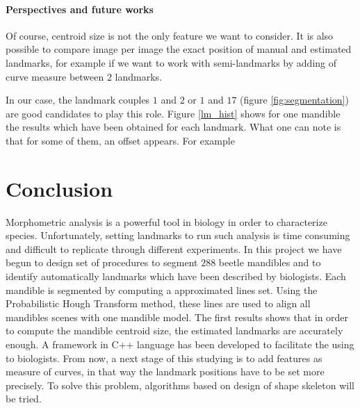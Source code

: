 \documentclass[twoside,twocolumn,10pt]{article}
\begin{document}
\paragraph{Perspectives and future works}
Of course, centroid size is not the only feature we want to
consider. It is also possible to compare image per image the exact
position of manual and estimated landmarks, for example if we want to
work with semi-landmarks by adding of curve measure between $2$
landmarks.

In our case, the landmark couples $1$ and $2$ or $1$ and $17$ (figure
\ref{fig:segmentation}) are good candidates to play this role. Figure
\ref{lm_hist} shows for one mandible the results which have been obtained
for each landmark. What one can note is that for some of them, an
offset appears. For example 
\section{Conclusion}
Morphometric analysis is a powerful tool in biology in order to
characterize species. Unfortunately, setting landmarks to run such
analysis is time consuming and difficult to replicate through
different experiments. In this project we have begun to design set of
procedures to segment $288$ beetle mandibles and to identify automatically
landmarks which have been described by biologists. Each mandible is
segmented by computing a approximated lines set. Using the
Probabilistic Hough Transform method, these lines are
used to align all mandibles scenes with one mandible model. The
first results shows that in order to compute the mandible centroid
size, the estimated landmarks are accurately enough. A framework in
C++ language has been developed to facilitate the using
to biologists. From now, a next stage of this studying is to add features as measure of curves,
in that way the landmark positions have to be set more precisely. To
solve this problem, algorithms based on design of shape skeleton will
be tried.




\end{document}
